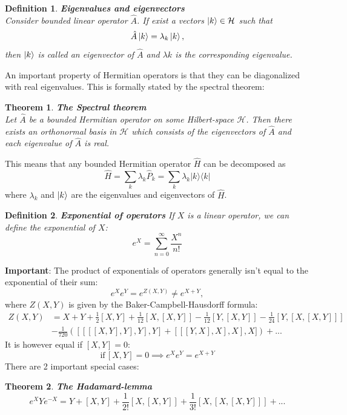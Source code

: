 \documentclass[12pt, a4paper,  nobibnotes]{article}
\newcommand{\ketbra}[2]{|#1\rangle\langle#2|}
\newtheorem{theorem}{Theorem}
\newtheorem{definition}{Definition}
\begin{document}
\begin{definition}
    \textbf{Eigenvalues and eigenvectors}
    \\Consider bounded linear operator $\hat A$. If exist a vectors $\ket k \in \mathcal H$ such that
    \begin{equation}
        \hat A \ket k = \lambda_k\ket k,
    \end{equation}
    then $\ket k$ is called an eigenvector of $\hat A$ and $\lambda k$ is the corresponding eigenvalue.
\end{definition}

An important property of Hermitian operators is that they can be diagonalized with real eigenvalues. 
This is formally stated by the spectral theorem:
\begin{theorem}
    \textbf{The Spectral theorem}
    \\Let $\hat A$ be a bounded Hermitian operator on some Hilbert-space $\mathcal H$. Then there exists an orthonormal
    basis in $\mathcal H$ which consists of the eigenvectors of $\hat A$ and each eigenvalue of $\hat A$ is real.
\end{theorem}
This means that any bounded Hermitian operator $\hat H$ can be decomposed as 
\begin{equation}
    \hat H = \sum\limits_{k}\lambda_k \hat P_k = \sum\limits_{k}\lambda_k \ketbra{k}{k}
\end{equation}
where $\lambda_k$ and $\ket k$ are the eigenvalues and eigenvectors of $\hat H$.


\begin{definition}
    \textbf{Exponential of operators}
    If $X$ is a linear operator, we can define the exponential of $X$:
    \begin{equation*}
        e^X = \sum\limits_{n=0}^\infty \frac{X^n}{n!} 
    \end{equation*}
\end{definition}
\textbf{Important}:
The product of exponentials of operators generally isn't equal to the exponential of their sum:
\begin{equation*}
    e^{X}e^{Y} = e^{Z(X,Y)}\neq e^{X+Y},
\end{equation*}
where $Z(X,Y)$ is given by the Baker-Campbell-Hausdorff formula:
\begin{align*}
    Z(X,Y) &= X + Y + \frac{1}{2}[X,Y] + \frac{1}{12}[X,[X,Y]] - \frac{1}{12}[Y,[X,Y]] -\frac{1}{24}[Y,[X,[X,Y]]] \\
    & - \frac{1}{720}([[[[X,Y],Y],Y],Y] + [[[Y,X],X],X],X]) + ...
\end{align*}
It is however equal if $[X,Y]=0$:
\begin{equation*}
    \textrm{if}\,[X,Y]=0 \implies  e^{X}e^{Y} = e^{X+Y}
\end{equation*}
There are 2 important special cases:
\begin{theorem}
    \textbf{The Hadamard-lemma}
    \begin{equation*}
        e^XYe^{-X} = Y + [X,Y] + \frac{1}{2!}[X,[X,Y]] + \frac{1}{3!}[X,[X,[X,Y]]] + ...
    \end{equation*}
\end{theorem}
\end{document}

